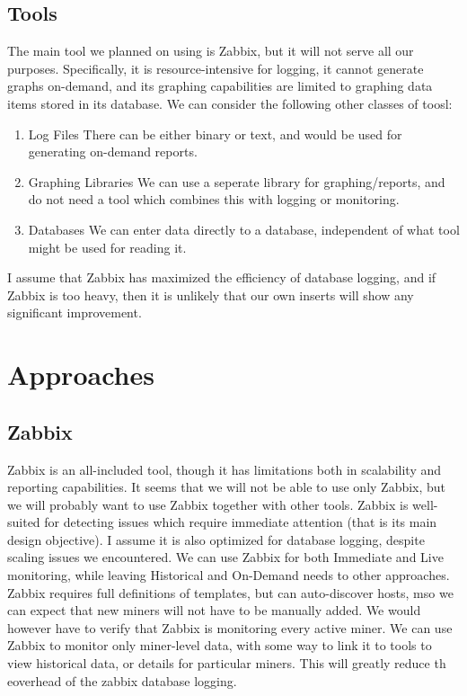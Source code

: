 \subsection{Tools}
The main tool we planned on using is Zabbix, but it will not serve all our purposes. Specifically, it is resource-intensive for logging, it cannot generate graphs on-demand, and its graphing capabilities are limited to graphing data items stored in its database. 
We can consider the following other classes of toosl:
\begin{enumerate}
	\item{Log Files} There can be either binary or text, and would be used for generating on-demand reports.
	\item{Graphing Libraries} We can use a seperate library for graphing/reports, and do not need a tool which combines this with logging or monitoring. 
	\item{Databases} We can enter data directly to a database, independent of what tool might be used for reading it. 
\end{enumerate}
I assume that Zabbix has maximized the efficiency of database logging, and if Zabbix is too heavy, then it is unlikely that our own inserts will show any significant improvement.


\section{Approaches}
\subsection{Zabbix}
Zabbix is an all-included tool, though it has limitations both in scalability and reporting capabilities. 
It seems that we will not be able to use only Zabbix, but we will probably want to use Zabbix together with other tools.
Zabbix is well-suited for detecting issues which require immediate attention (that is its main design objective). 
I assume it is also optimized for database logging, despite scaling issues we encountered.
We can use Zabbix for both Immediate and Live monitoring, while leaving Historical and On-Demand needs to other approaches.
Zabbix requires full definitions of templates, but can auto-discover hosts, mso we can expect that new miners will not have to be manually added. We would however have to verify that Zabbix is monitoring every active miner.
We can use Zabbix to monitor only miner-level data, with some way to link it to tools to view historical data, or details for particular miners. This will greatly reduce th eoverhead of the zabbix database logging.

